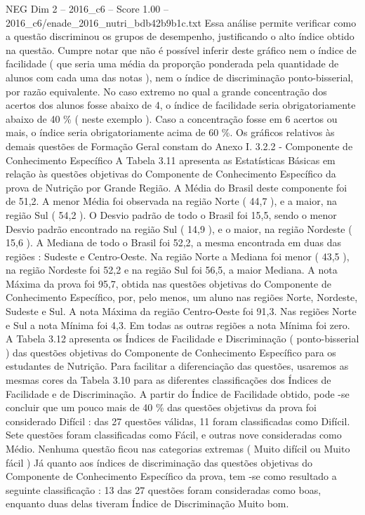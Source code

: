 \begin{textsample}{NEG Dim 2 – 2016\_c6 – Score 1.00 – 2016\_c6/enade\_2016\_nutri\_bdb42b9b1c.txt}
Essa análise permite verificar como a questão discriminou os grupos de desempenho, justificando o alto índice obtido na questão.
Cumpre notar que não é possível inferir deste gráfico nem o índice de facilidade ( que seria uma média da proporção ponderada pela quantidade de alunos com cada uma das notas ), nem o índice de discriminação ponto-bisserial, por razão equivalente.
No caso extremo no qual a grande concentração dos acertos dos alunos fosse abaixo de 4, o índice de facilidade seria obrigatoriamente abaixo de 40 \% ( neste exemplo ).
Caso a concentração fosse em 6 acertos ou mais, o índice seria obrigatoriamente acima de 60 \%.
Os gráficos relativos às demais questões de Formação Geral constam do Anexo I. 3.2.2 - Componente de Conhecimento Específico A Tabela 3.11 apresenta as Estatísticas Básicas em relação às questões objetivas do Componente de Conhecimento Específico da prova de Nutrição por Grande Região.
A Média do Brasil deste componente foi de 51,2.
A menor Média foi observada na região Norte ( 44,7 ), e a maior, na região Sul ( 54,2 ).
O Desvio padrão de todo o Brasil foi 15,5, sendo o menor Desvio padrão encontrado na região Sul ( 14,9 ), e o maior, na região Nordeste ( 15,6 ).
A Mediana de todo o Brasil foi 52,2, a mesma encontrada em duas das regiões : Sudeste e Centro-Oeste.
Na região Norte a Mediana foi menor ( 43,5 ), na região Nordeste foi 52,2 e na região Sul foi 56,5, a maior Mediana.
A nota Máxima da prova foi 95,7, obtida nas questões objetivas do Componente de Conhecimento Específico, por, pelo menos, um aluno nas regiões Norte, Nordeste, Sudeste e Sul.
A nota Máxima da região Centro-Oeste foi 91,3.
Nas regiões Norte e Sul a nota Mínima foi 4,3.
Em todas as outras regiões a nota Mínima foi zero.
A Tabela 3.12 apresenta os Índices de Facilidade e Discriminação ( ponto-bisserial ) das questões objetivas do Componente de Conhecimento Específico para os estudantes de Nutrição.
Para facilitar a diferenciação das questões, usaremos as mesmas cores da Tabela 3.10 para as diferentes classificações dos Índices de Facilidade e de Discriminação.
A partir do Índice de Facilidade obtido, pode -se concluir que um pouco mais de 40 \% das questões objetivas da prova foi considerado Difícil : das 27 questões válidas, 11 foram classificadas como Difícil.
Sete questões foram classificadas como Fácil, e outras nove consideradas como Médio.
Nenhuma questão ficou nas categorias extremas ( Muito difícil ou Muito fácil ) Já quanto aos índices de discriminação das questões objetivas do Componente de Conhecimento Específico da prova, tem -se como resultado a seguinte classificação : 13 das 27 questões foram consideradas como boas, enquanto duas delas tiveram Índice de Discriminação Muito bom.

\end{textsample}
